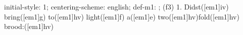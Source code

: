 initial-style: 1;
centering-scheme: english;
def-m1: \grealign;
(f3) 1. Didst([em1]iv) bring([em1]g) to([em1]hv) light([em1]f) a([em1]e) two([em1]hv)fold([em1]hv) brood:([em1]hv)